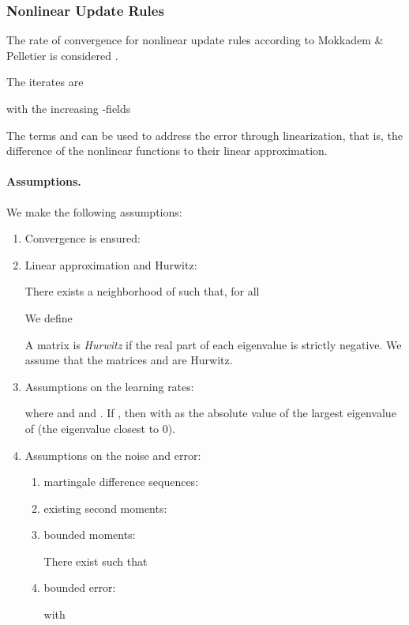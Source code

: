 \documentclass{article}
\begin{document}
\subsubsection{Nonlinear Update Rules}
\label{sec:nonlinur}
The rate of convergence for nonlinear update rules according to
Mokkadem \& Pelletier is considered \cite{Mokkadem:06}.

The iterates are

with the increasing -fields

The terms  and  can be used to address
the error through linearization, that is, the difference of the
nonlinear functions to their linear approximation.


\paragraph{Assumptions.}
We make the following assumptions:
\begin{enumerate}[label=\textbf{(A\arabic*)}]
\item Convergence is ensured:


\item Linear approximation and Hurwitz:

There exists a neighborhood  of  such that,
for all 


We define

A matrix is {\em Hurwitz} if the real part of each eigenvalue is strictly
negative.
We assume that the matrices  and  are Hurwitz.

\item Assumptions on the learning rates:


where  and  and .
If , then  with 
as the absolute value of the largest eigenvalue of  (the
eigenvalue closest to 0).

\item Assumptions on the noise and error:
\begin{enumerate}
\item martingale difference sequences:

\item existing second moments:


\item bounded moments:

There exist  such that



\item bounded error:

with

\end{enumerate}

\end{enumerate}
\end{document}
